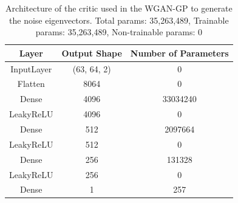 \documentclass[11pt,a4paper,twoside]{report}
\begin{document}
\begin{table}[]
  \centering
  \begin{tabular}{c c c}
      \hline
      \textbf{Layer} & \textbf{Output Shape} & \textbf{Number of Parameters} \\ \hline
      InputLayer            & (63, 64, 2)   & 0                 \\
      Flatten               & 8064          & 0                 \\
      Dense                 & 4096          & 33034240          \\
      LeakyReLU             & 4096          & 0                 \\
      Dense                 & 512           & 2097664           \\
      LeakyReLU             & 512           & 0                 \\
      Dense                 & 256           & 131328            \\
      LeakyReLU             & 256           & 0                 \\
      Dense                 & 1             & 257               \\
      \end{tabular}
  \caption{Architecture of the critic used in the WGAN-GP to generate the noise eigenvectors. Total params: 35,263,489, Trainable params: 35,263,489, Non-trainable params: 0}
  \label{tab:noise_evecs_critic_WGANGP_architecture}
\end{table}
\end{document}
